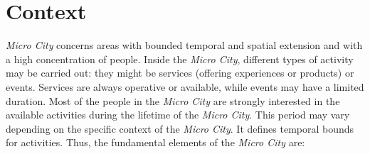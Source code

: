\section{Context}
\textit{Micro City} concerns areas with bounded temporal and spatial extension and with a high concentration of people.
Inside the \textit{Micro City}, different types of activity may be carried out: they might be services (offering experiences or products) or events. Services are always operative or available, while events may have a limited duration.
Most of the people in the \textit{Micro City} are strongly interested in the available activities during the lifetime of the \textit{Micro City}. This period may vary depending on the specific context of the \textit{Micro City}. It defines temporal bounds for activities.
Thus, the fundamental elements of the \textit{Micro City} are:
